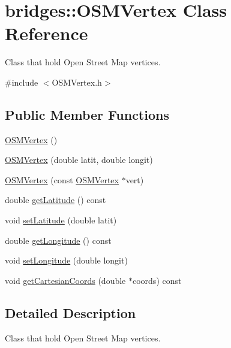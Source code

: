 \hypertarget{classbridges_1_1_o_s_m_vertex}{}\section{bridges\+:\+:O\+S\+M\+Vertex Class Reference}
\label{classbridges_1_1_o_s_m_vertex}


Class that hold Open Street Map vertices.  




{\ttfamily \#include $<$O\+S\+M\+Vertex.\+h$>$}

\subsection*{Public Member Functions}
\begin{DoxyCompactItemize}
\item 
\mbox{\hyperlink{classbridges_1_1_o_s_m_vertex_a80b1abcf72326fa44ec74faf2236418e}{O\+S\+M\+Vertex}} ()
\item 
\mbox{\hyperlink{classbridges_1_1_o_s_m_vertex_a014dddd55752cad9aa87cc45c04b4db8}{O\+S\+M\+Vertex}} (double latit, double longit)
\item 
\mbox{\hyperlink{classbridges_1_1_o_s_m_vertex_a00c4a80dd2a249f9e1dc92c0ed798356}{O\+S\+M\+Vertex}} (const \mbox{\hyperlink{classbridges_1_1_o_s_m_vertex}{O\+S\+M\+Vertex}} $\ast$vert)
\item 
double \mbox{\hyperlink{classbridges_1_1_o_s_m_vertex_aeb44f4c3967d9ed15c606699c830ac2c}{get\+Latitude}} () const
\item 
void \mbox{\hyperlink{classbridges_1_1_o_s_m_vertex_a8011165f0932b3b69cf303b41b2d55a1}{set\+Latitude}} (double latit)
\item 
double \mbox{\hyperlink{classbridges_1_1_o_s_m_vertex_a90d51ece713519a272e4224171b30b34}{get\+Longitude}} () const
\item 
void \mbox{\hyperlink{classbridges_1_1_o_s_m_vertex_a80cdc32c79a8f2e5c962be3856b75229}{set\+Longitude}} (double longit)
\item 
void \mbox{\hyperlink{classbridges_1_1_o_s_m_vertex_a3c89840e0c5414d38ca177183a6052fa}{get\+Cartesian\+Coords}} (double $\ast$coords) const
\end{DoxyCompactItemize}


\subsection{Detailed Description}
Class that hold Open Street Map vertices. 

